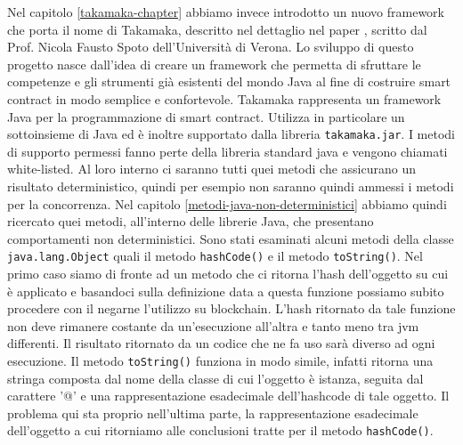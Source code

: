 Nel capitolo \ref{takamaka-chapter} abbiamo invece introdotto un nuovo framework che porta il nome di Takamaka, descritto nel dettaglio nel paper \cite{paper-takamaka:spoto}, scritto dal Prof. Nicola Fausto Spoto dell'Università di Verona. Lo sviluppo di questo progetto nasce dall'idea di creare un framework  che permetta di sfruttare le competenze e gli strumenti già esistenti del mondo Java al fine di costruire smart contract in modo semplice e confortevole. Takamaka rappresenta un framework Java per la programmazione di smart contract. Utilizza in particolare un sottoinsieme di Java ed è inoltre supportato dalla libreria \lstinline|takamaka.jar|. I metodi di supporto permessi fanno perte della libreria standard java e vengono chiamati white-listed. Al loro interno ci saranno tutti quei metodi che assicurano un risultato deterministico, quindi per esempio non saranno quindi ammessi i metodi per la concorrenza. Nel capitolo \ref{metodi-java-non-deterministici} abbiamo quindi ricercato quei metodi, all'interno delle librerie Java, che presentano comportamenti non deterministici. Sono stati esaminati alcuni metodi della classe \lstinline|java.lang.Object| quali il metodo \lstinline|hashCode()| e il metodo \lstinline|toString()|. Nel primo caso siamo di fronte ad un metodo che ci ritorna l'hash dell'oggetto su cui è applicato e basandoci sulla definizione data a questa funzione possiamo subito procedere con il negarne l'utilizzo su blockchain. L'hash ritornato da tale funzione non deve rimanere costante da un'esecuzione all'altra e tanto meno tra jvm differenti. Il risultato ritornato da un codice che ne fa uso sarà diverso ad ogni esecuzione. Il metodo \lstinline|toString()| funziona in modo simile, infatti ritorna una stringa composta dal nome della classe di cui l'oggetto è istanza, seguita dal carattere '@' e una rappresentazione esadecimale dell'hashcode di tale oggetto. Il problema qui sta proprio nell'ultima parte, la rappresentazione esadecimale dell'oggetto a cui ritorniamo alle conclusioni tratte per il metodo \lstinline|hashCode()|.
